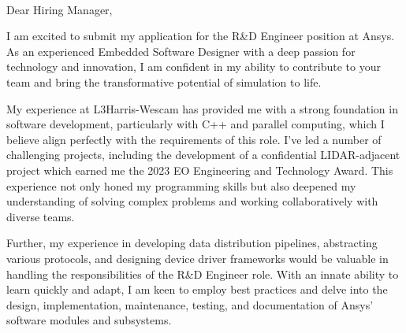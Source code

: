\documentclass[a4paper,ragged2e,withhyper]{altacv}
\begin{document}
\graphicspath{
    {emoticons/interests}
}

\DeclareRobustCommand{\addEmoticon}[1]{%
  \begingroup\normalfont
  \texttt{[image: \#1]}%
  \endgroup
}

\\
  \medskip


\begin{fullwidth}
\makecvheader


\noindent
Dear Hiring Manager,

\vspace{0.5cm}

\noindent
I am excited to submit my application for the R\&D Engineer position at Ansys. As an experienced Embedded Software Designer with a deep passion for technology and innovation, I am confident in my ability to contribute to your team and bring the transformative potential of simulation to life.

\vspace{0.5cm}

\noindent
My experience at L3Harris-Wescam has provided me with a strong foundation in software development, particularly with C++ and parallel computing, which I believe align perfectly with the requirements of this role. I've led a number of challenging projects, including the development of a confidential LIDAR-adjacent project which earned me the 2023 EO Engineering and Technology Award. This experience not only honed my programming skills but also deepened my understanding of solving complex problems and working collaboratively with diverse teams.

\vspace{0.5cm}

\noindent
Further, my experience in developing data distribution pipelines, abstracting various protocols, and designing device driver frameworks would be valuable in handling the responsibilities of the R\&D Engineer role. With an innate ability to learn quickly and adapt, I am keen to employ best practices and delve into the design, implementation, maintenance, testing, and documentation of Ansys' software modules and subsystems.


\end{fullwidth}
\end{document}
